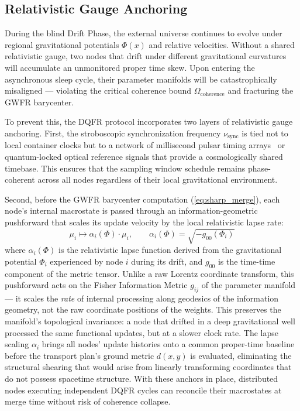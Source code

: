 \documentclass[twocolumn, 10pt, journal, letterpaper]{IEEEtran}
\begin{document}
\subsection{Relativistic Gauge Anchoring}
During the blind Drift Phase, the external universe continues to evolve under regional gravitational potentials $\Phi(x)$ and relative velocities. Without a shared relativistic gauge, two nodes that drift under different gravitational curvatures will accumulate an unmonitored proper time skew. Upon entering the asynchronous sleep cycle, their parameter manifolds will be catastrophically misaligned --- violating the critical coherence bound $\Omega_{\text{coherence}}$ and fracturing the GWFR barycenter.

To prevent this, the DQFR protocol incorporates two layers of relativistic gauge anchoring. First, the stroboscopic synchronization frequency $\nu_{\text{sync}}$ is tied not to local container clocks but to a network of millisecond pulsar timing arrays~\cite{lorimer2004} or quantum-locked optical reference signals that provide a cosmologically shared timebase. This ensures that the sampling window schedule remains phase-coherent across all nodes regardless of their local gravitational environment.

Second, before the GWFR barycenter computation (\eqref{eq:sharp_merge}), each node's internal macrostate is passed through an information-geometric pushforward that scales its update velocity by the local relativistic lapse rate:
\begin{equation}
\mu_i \mapsto \alpha_i(\Phi) \cdot \mu_i, \qquad
\alpha_i(\Phi) = \sqrt{-g_{00}(\Phi_i)}
\label{eq:lapse_pushforward}
\end{equation}
where $\alpha_i(\Phi)$ is the relativistic lapse function derived from the gravitational potential $\Phi_i$ experienced by node $i$ during its drift, and $g_{00}$ is the time-time component of the metric tensor. Unlike a raw Lorentz coordinate transform, this pushforward acts on the Fisher Information Metric $g_{ij}$ of the parameter manifold --- it scales the \textit{rate} of internal processing along geodesics of the information geometry, not the raw coordinate positions of the weights. This preserves the manifold's topological invariance: a node that drifted in a deep gravitational well processed the same functional updates, but at a slower clock rate. The lapse scaling $\alpha_i$ brings all nodes' update histories onto a common proper-time baseline before the transport plan's ground metric $d(x,y)$ is evaluated, eliminating the structural shearing that would arise from linearly transforming coordinates that do not possess spacetime structure. With these anchors in place, distributed nodes executing independent DQFR cycles can reconcile their macrostates at merge time without risk of coherence collapse.
\end{document}
